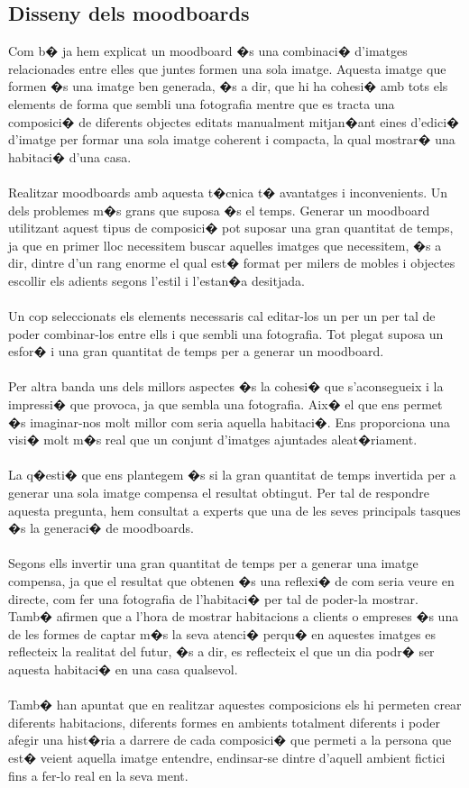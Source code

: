 \documentclass[12pt,a4paper,openright,oneside]{article}
\numberwithin{equation}{section}
\theoremstyle{definition}
\begin{document}
\subsection{Disseny dels moodboards}

Com b� ja hem explicat un moodboard �s una combinaci� d'imatges relacionades entre elles que juntes formen una sola imatge. Aquesta imatge que formen �s una imatge ben generada, �s a dir, que hi ha cohesi� amb tots els elements de forma que sembli una fotografia mentre que es tracta una composici� de diferents objectes editats manualment mitjan�ant eines d'edici� d'imatge per formar una sola imatge coherent i compacta, la qual mostrar� una habitaci� d'una casa.\\\\
Realitzar moodboards amb aquesta t�cnica t� avantatges i inconvenients. Un dels problemes m�s grans que suposa �s el temps. Generar un moodboard utilitzant aquest tipus de composici� pot suposar una gran quantitat de temps, ja que en primer lloc necessitem buscar aquelles imatges que necessitem, �s a dir, dintre d'un rang enorme el qual est� format per milers de mobles i objectes escollir els adients segons l'estil i l'estan�a desitjada. \\\\
Un cop seleccionats els elements necessaris cal editar-los un per un per tal de poder combinar-los entre ells i que sembli una fotografia. Tot plegat suposa un esfor� i una gran quantitat de temps per a generar un moodboard.\\\\
Per altra banda uns dels millors aspectes �s la cohesi� que s'aconsegueix i la impressi� que provoca, ja que sembla una fotografia. Aix� el que ens permet �s imaginar-nos molt millor com seria aquella habitaci�. Ens proporciona una visi� molt m�s real que un conjunt d'imatges ajuntades aleat�riament.\\\\
La q�esti� que ens plantegem �s si la gran quantitat de temps invertida per a generar una sola imatge compensa el resultat obtingut. Per tal de respondre aquesta pregunta, hem consultat a experts que una de les seves principals tasques �s la generaci� de moodboards.\\\\
Segons ells invertir una gran quantitat de temps per a generar una imatge compensa, ja que el resultat que obtenen �s una reflexi� de com seria veure en directe, com fer una fotografia de l'habitaci� per tal de poder-la mostrar.
Tamb� afirmen que a l'hora de mostrar habitacions a clients o empreses �s una de les formes de captar m�s la seva atenci� perqu� en aquestes imatges es reflecteix la realitat del futur, �s a dir, es reflecteix el que un dia podr� ser aquesta habitaci� en una casa qualsevol.\\\\ Tamb� han apuntat que en realitzar aquestes composicions els hi permeten crear diferents habitacions, diferents formes en ambients totalment diferents i poder afegir una hist�ria a darrere de cada composici� que permeti a la persona que est� veient aquella imatge entendre, endinsar-se dintre d'aquell ambient fictici fins a fer-lo real en la seva ment.\\\
\end{document}
